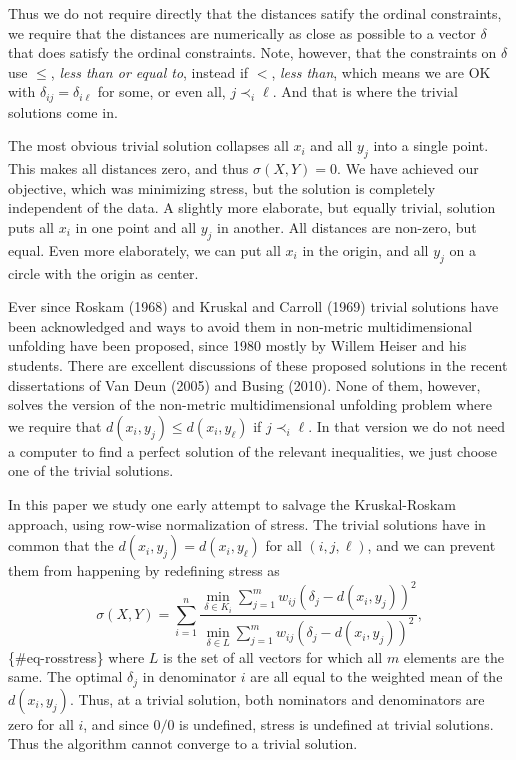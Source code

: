 \documentclass[
  12pt,
]{article}
\begin{document}
Thus we do not require directly that the distances satify the ordinal constraints,
we require that the distances are numerically as close as possible to a vector
\(\delta\) that does satisfy the ordinal constraints. Note, however, that
the constraints on \(\delta\) use \(\leq\), \emph{less than or equal to}, instead if \(<\),
\emph{less than}, which means we are OK with \(\delta_{ij}=\delta_{i\ell}\) for some,
or even all, \(j\prec_i\ell\). And that is where the trivial solutions come in.

The most obvious trivial solution collapses all \(x_i\) and all \(y_j\) into a single point.
This makes all distances zero, and thus \(\sigma(X,Y)=0\). We have achieved our
objective, which was minimizing stress, but the solution is completely independent
of the data. A slightly more elaborate, but equally trivial, solution puts all
\(x_i\) in one point and all \(y_j\) in another. All distances are non-zero, but equal.
Even more elaborately, we can put all \(x_i\) in the origin, and all \(y_j\) on a
circle with the origin as center.

Ever since Roskam (1968) and Kruskal and Carroll (1969) trivial solutions have been acknowledged
and ways to avoid them in non-metric multidimensional unfolding have been proposed,
since 1980 mostly by Willem Heiser and his students. There are excellent discussions
of these proposed solutions in the recent dissertations of Van Deun (2005) and Busing (2010).
None of them, however, solves the version of the
non-metric multidimensional unfolding problem where we require that \(d(x_i,y_j)\leq d(x_i,y_\ell)\)
if \(j\prec_i\ell\). In that version we do not need a computer to find a perfect solution
of the relevant inequalities, we just choose one of the trivial solutions.

In this paper we study one early attempt to salvage the Kruskal-Roskam approach, using
row-wise normalization of stress. The trivial solutions have in common that the
\(d(x_i,y_j)=d(x_i,y_\ell)\) for all \((i,j,\ell)\), and we can prevent them from happening by
redefining stress as
\[
\sigma(X,Y)=\sum_{i=1}^n\frac{\min_{\delta\in K_i}\sum_{j=1}^m w_{ij}(\delta_j-d(x_i,y_j))^2}
{\min_{\delta\in L}\sum_{j=1}^m w_{ij}(\delta_j-d(x_i,y_j))^2},
\]\{\#eq-rosstress\}
where \(L\) is the set of all vectors for which all \(m\) elements are the same. The optimal \(\delta_j\)
in denominator \(i\) are all equal to the weighted mean of the \(d(x_i,y_j)\). Thus, at a trivial
solution, both nominators and denominators are zero for all \(i\), and since \(0/0\) is undefined,
stress is undefined at trivial solutions. Thus the algorithm cannot converge to a trivial
solution.
\end{document}

